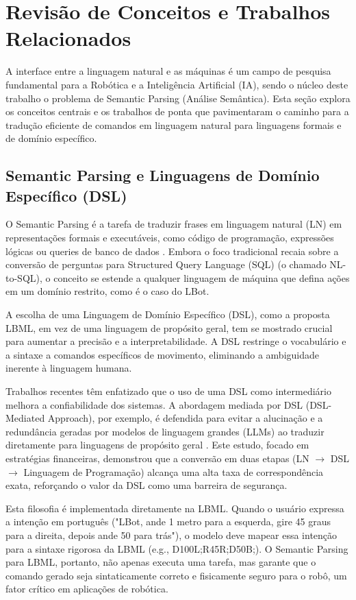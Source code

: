 \documentclass[12pt]{article}
\begin{document}
\section{Revisão de Conceitos e Trabalhos Relacionados}

A interface entre a linguagem natural e as máquinas é um campo de pesquisa fundamental para a Robótica e a Inteligência Artificial (IA), sendo o núcleo deste trabalho o problema de Semantic Parsing (Análise Semântica). Esta seção explora os conceitos centrais e os trabalhos de ponta que pavimentaram o caminho para a tradução eficiente de comandos em linguagem natural para linguagens formais e de domínio específico.

\subsection{Semantic Parsing e Linguagens de Domínio Específico (DSL)}

O Semantic Parsing é a tarefa de traduzir frases em linguagem natural (LN) em representações formais e executáveis, como código de programação, expressões lógicas ou queries de banco de dados \citep{Sharma2025}. Embora o foco tradicional recaia sobre a conversão de perguntas para Structured Query Language (SQL) (o chamado NL-to-SQL), o conceito se estende a qualquer linguagem de máquina que defina ações em um domínio restrito, como é o caso do LBot.

A escolha de uma Linguagem de Domínio Específico (DSL), como a proposta LBML, em vez de uma linguagem de propósito geral, tem se mostrado crucial para aumentar a precisão e a interpretabilidade. A DSL restringe o vocabulário e a sintaxe a comandos específicos de movimento, eliminando a ambiguidade inerente à linguagem humana.

Trabalhos recentes têm enfatizado que o uso de uma DSL como intermediário melhora a confiabilidade dos sistemas. A abordagem mediada por DSL (DSL-Mediated Approach), por exemplo, é defendida para evitar a alucinação e a redundância geradas por modelos de linguagem grandes (LLMs) ao traduzir diretamente para linguagens de propósito geral \citep{Wu2025}. Este estudo, focado em estratégias financeiras, demonstrou que a conversão em duas etapas (LN $\rightarrow$ DSL $\rightarrow$ Linguagem de Programação) alcança uma alta taxa de correspondência exata, reforçando o valor da DSL como uma barreira de segurança.

Esta filosofia é implementada diretamente na LBML. Quando o usuário expressa a intenção em português ("LBot, ande 1 metro para a esquerda, gire 45 graus para a direita, depois ande 50 para trás"), o modelo deve mapear essa intenção para a sintaxe rigorosa da LBML (e.g., D100L;R45R;D50B;). O Semantic Parsing para LBML, portanto, não apenas executa uma tarefa, mas garante que o comando gerado seja sintaticamente correto e fisicamente seguro para o robô, um fator crítico em aplicações de robótica.
\end{document}
